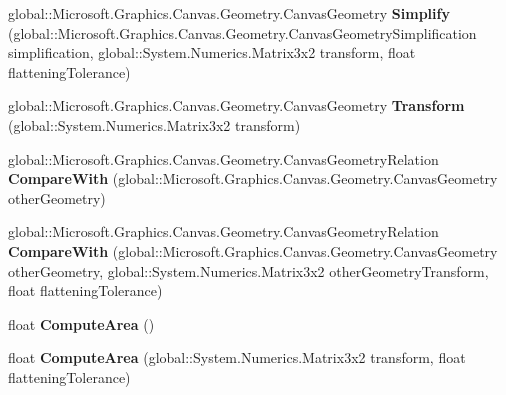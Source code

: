 \begin{DoxyCompactItemize}
global\+::\+Microsoft.\+Graphics.\+Canvas.\+Geometry.\+Canvas\+Geometry {\bfseries Simplify} (global\+::\+Microsoft.\+Graphics.\+Canvas.\+Geometry.\+Canvas\+Geometry\+Simplification simplification, global\+::\+System.\+Numerics.\+Matrix3x2 transform, float flattening\+Tolerance)
\item 
\mbox{\label{interface_microsoft_1_1_graphics_1_1_canvas_1_1_geometry_1_1_i_canvas_geometry_ac5c73fa815ab9daab0120a273c2a9f7a}} 
global\+::\+Microsoft.\+Graphics.\+Canvas.\+Geometry.\+Canvas\+Geometry {\bfseries Transform} (global\+::\+System.\+Numerics.\+Matrix3x2 transform)
\item 
\mbox{\label{interface_microsoft_1_1_graphics_1_1_canvas_1_1_geometry_1_1_i_canvas_geometry_a2ccaa7f710d287e5e4dd8170deb5f559}} 
global\+::\+Microsoft.\+Graphics.\+Canvas.\+Geometry.\+Canvas\+Geometry\+Relation {\bfseries Compare\+With} (global\+::\+Microsoft.\+Graphics.\+Canvas.\+Geometry.\+Canvas\+Geometry other\+Geometry)
\item 
\mbox{\label{interface_microsoft_1_1_graphics_1_1_canvas_1_1_geometry_1_1_i_canvas_geometry_a05b0590f7526c5e62b664f3c73b3f28e}} 
global\+::\+Microsoft.\+Graphics.\+Canvas.\+Geometry.\+Canvas\+Geometry\+Relation {\bfseries Compare\+With} (global\+::\+Microsoft.\+Graphics.\+Canvas.\+Geometry.\+Canvas\+Geometry other\+Geometry, global\+::\+System.\+Numerics.\+Matrix3x2 other\+Geometry\+Transform, float flattening\+Tolerance)
\item 
\mbox{\label{interface_microsoft_1_1_graphics_1_1_canvas_1_1_geometry_1_1_i_canvas_geometry_a0f5c0e7cc934073f79ef8689581c700e}} 
float {\bfseries Compute\+Area} ()
\item 
\mbox{\label{interface_microsoft_1_1_graphics_1_1_canvas_1_1_geometry_1_1_i_canvas_geometry_abccc0c3b05f197af6abf2a494662b435}} 
float {\bfseries Compute\+Area} (global\+::\+System.\+Numerics.\+Matrix3x2 transform, float flattening\+Tolerance)
\item 

\end{DoxyCompactItemize}
